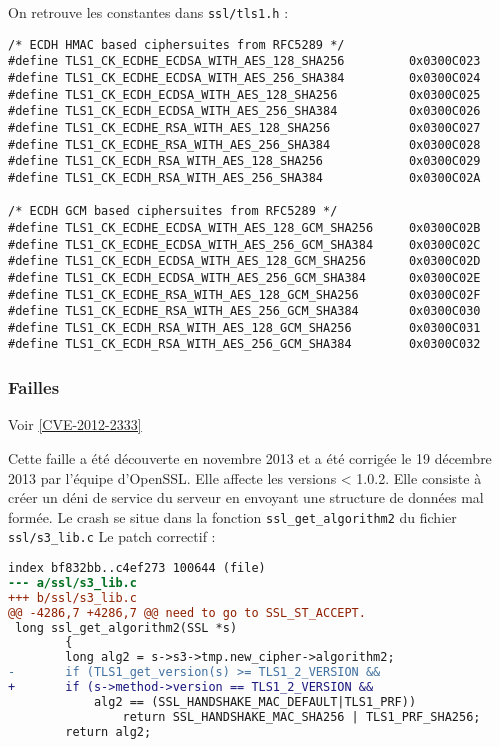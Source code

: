 On retrouve les constantes dans \verb+ssl/tls1.h+ :
\begin{lstlisting}[style=customc,caption=Constantes TLS 1.2, label=constantes-tls-1.2]
/* ECDH HMAC based ciphersuites from RFC5289 */
#define TLS1_CK_ECDHE_ECDSA_WITH_AES_128_SHA256         0x0300C023
#define TLS1_CK_ECDHE_ECDSA_WITH_AES_256_SHA384         0x0300C024
#define TLS1_CK_ECDH_ECDSA_WITH_AES_128_SHA256          0x0300C025
#define TLS1_CK_ECDH_ECDSA_WITH_AES_256_SHA384          0x0300C026
#define TLS1_CK_ECDHE_RSA_WITH_AES_128_SHA256           0x0300C027
#define TLS1_CK_ECDHE_RSA_WITH_AES_256_SHA384           0x0300C028
#define TLS1_CK_ECDH_RSA_WITH_AES_128_SHA256            0x0300C029
#define TLS1_CK_ECDH_RSA_WITH_AES_256_SHA384            0x0300C02A

/* ECDH GCM based ciphersuites from RFC5289 */
#define TLS1_CK_ECDHE_ECDSA_WITH_AES_128_GCM_SHA256	    0x0300C02B
#define TLS1_CK_ECDHE_ECDSA_WITH_AES_256_GCM_SHA384	    0x0300C02C
#define TLS1_CK_ECDH_ECDSA_WITH_AES_128_GCM_SHA256      0x0300C02D
#define TLS1_CK_ECDH_ECDSA_WITH_AES_256_GCM_SHA384      0x0300C02E
#define TLS1_CK_ECDHE_RSA_WITH_AES_128_GCM_SHA256       0x0300C02F
#define TLS1_CK_ECDHE_RSA_WITH_AES_256_GCM_SHA384       0x0300C030
#define TLS1_CK_ECDH_RSA_WITH_AES_128_GCM_SHA256        0x0300C031
#define TLS1_CK_ECDH_RSA_WITH_AES_256_GCM_SHA384        0x0300C032
\end{lstlisting}

\subsubsection{Failles}
\setcounter{subsubsubsection}{0}

Voir \ref{CVE-2012-2333}


Cette faille a été découverte en novembre 2013 et a été corrigée le 19 décembre 2013 par l'équipe d'OpenSSL.
Elle affecte les versions < 1.0.2. Elle consiste à créer un déni de service du serveur en envoyant une structure de données mal formée. Le crash se situe dans la fonction \verb+ssl_get_algorithm2+ du fichier \verb+ssl/s3_lib.c+
Le patch correctif :
\begin{lstlisting}[language=diff,caption=patch-cve-2013-6449, label=patch-cve-2013-6449]
index bf832bb..c4ef273 100644 (file)
--- a/ssl/s3_lib.c
+++ b/ssl/s3_lib.c
@@ -4286,7 +4286,7 @@ need to go to SSL_ST_ACCEPT.
 long ssl_get_algorithm2(SSL *s)
        {
        long alg2 = s->s3->tmp.new_cipher->algorithm2;
-       if (TLS1_get_version(s) >= TLS1_2_VERSION &&
+       if (s->method->version == TLS1_2_VERSION &&
            alg2 == (SSL_HANDSHAKE_MAC_DEFAULT|TLS1_PRF))
                return SSL_HANDSHAKE_MAC_SHA256 | TLS1_PRF_SHA256;
        return alg2;
\end{lstlisting}
